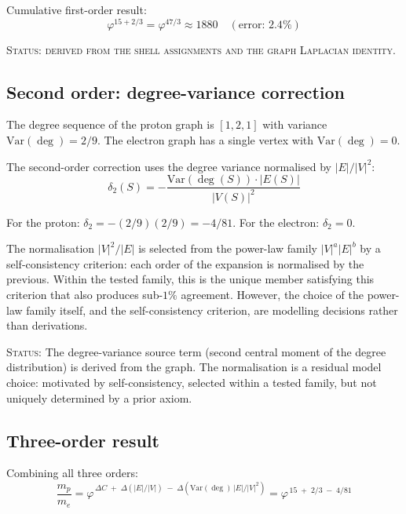 \documentclass[12pt]{article}
\newcommand{\phig}{\varphi}
\begin{document}
Cumulative first-order result:
\begin{equation}
    \phig^{15 + 2/3} = \phig^{47/3} \approx 1880 \quad (\text{error: } 2.4\%)
\end{equation}

\textsc{Status: derived from the shell assignments and the graph Laplacian identity.}

\subsection{Second order: degree-variance correction}

The degree sequence of the proton graph is $[1, 2, 1]$ with variance $\mathrm{Var}(\deg) = 2/9$. The electron graph has a single vertex with $\mathrm{Var}(\deg) = 0$.

The second-order correction uses the degree variance normalised by $|E|/|V|^2$:
\begin{equation}
    \delta_2(S) = -\frac{\mathrm{Var}(\deg(S)) \cdot |E(S)|}{|V(S)|^2}
\end{equation}

For the proton: $\delta_2 = -(2/9)(2/9) = -4/81$. For the electron: $\delta_2 = 0$.

The normalisation $|V|^2/|E|$ is selected from the power-law family $|V|^a |E|^b$ by a self-consistency criterion: each order of the expansion is normalised by the previous. Within the tested family, this is the unique member satisfying this criterion that also produces sub-$1\%$ agreement. However, the choice of the power-law family itself, and the self-consistency criterion, are modelling decisions rather than derivations.

\textsc{Status:} The degree-variance source term (second central moment of the degree distribution) is derived from the graph. The normalisation is a residual model choice: motivated by self-consistency, selected within a tested family, but not uniquely determined by a prior axiom.

\subsection{Three-order result}

Combining all three orders:
\begin{equation}\label{eq:threeorder}
    \frac{m_p}{m_e} = \phig^{\,\Delta C \;+\; \Delta(|E|/|V|) \;-\; \Delta(\mathrm{Var}(\deg)\,|E|/|V|^2)} = \phig^{\,15 \;+\; 2/3 \;-\; 4/81}
\end{equation}
\end{document}
